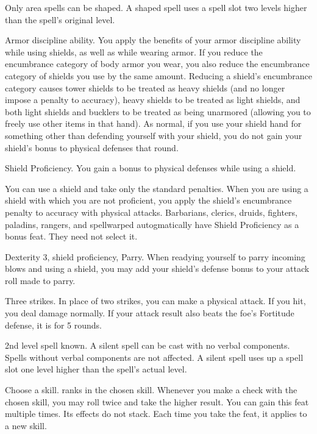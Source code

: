 Only area spells can be shaped.
A shaped spell uses a spell slot two levels higher than the spell's original level.

\featpre Armor discipline ability.
\featben You apply the benefits of your armor discipline ability while using shields, as well as while wearing armor.
If you reduce the encumbrance category of body armor you wear, you also reduce the encumbrance category of shields you use by the same amount.
Reducing a shield's encumbrance category causes tower shields to be treated as heavy shields (and no longer impose a  penalty to accuracy), heavy shields to be treated as light shields, and both light shields and bucklers to be treated as being unarmored (allowing you to freely use other items in that hand).
As normal, if you use your shield hand for something other than defending yourself with your shield, you do not gain your shield's bonus to physical defenses that round.

\featpre Shield Proficiency.
\featben You gain a  bonus to physical defenses while using a shield.

\featben You can use a shield and take only the standard penalties.
When you are using a shield with which you are not proficient, you apply the shield's encumbrance penalty to accuracy with physical attacks.
Barbarians, clerics, druids, fighters, paladins, rangers, and spellwarped autogmatically have Shield Proficiency as a bonus feat.
They need not select it.

\featpres Dexterity 3, shield proficiency, Parry.
\featben When readying yourself to parry incoming blows and using a shield, you may add your shield's defense bonus to your attack roll made to parry.

\featpre Three strikes.
\featben In place of two strikes, you can make a physical attack.
If you hit, you deal damage normally.
If your attack result also beats the foe's Fortitude defense, it is \staggered for 5 rounds.

\featpre 2nd level spell known.
\featben A silent spell can be cast with no verbal components.
Spells without verbal components are not affected.
A silent spell uses up a spell slot one level higher than the spell's actual level.

Choose a skill.
 ranks in the chosen skill.
\featben Whenever you make a check with the chosen skill, you may roll twice and take the higher result.
You can gain this feat multiple times.
Its effects do not stack.
Each time you take the feat, it applies to a new skill.

